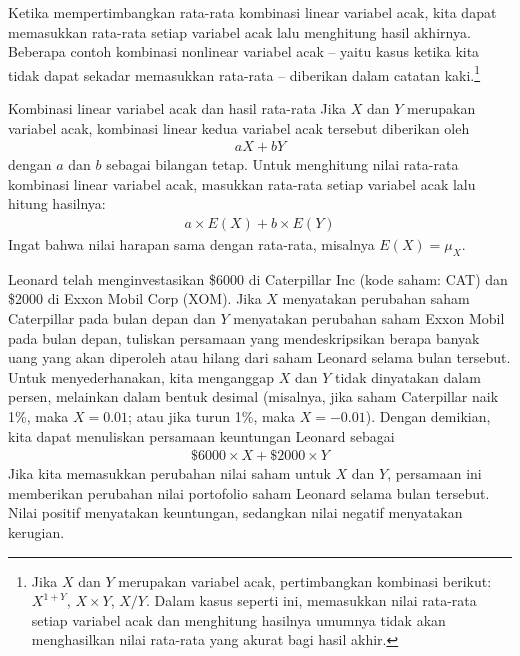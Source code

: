 \D{\newpage}

Ketika mempertimbangkan rata-rata kombinasi linear variabel acak, kita dapat memasukkan rata-rata setiap variabel acak lalu menghitung hasil akhirnya. Beberapa contoh kombinasi nonlinear variabel acak -- yaitu kasus ketika kita tidak dapat sekadar memasukkan rata-rata -- diberikan dalam catatan kaki.\footnote{Jika $X$ dan $Y$ merupakan variabel acak, pertimbangkan kombinasi berikut: $X^{1+Y}$, $X\times Y$, $X/Y$. Dalam kasus seperti ini, memasukkan nilai rata-rata setiap variabel acak dan menghitung hasilnya umumnya tidak akan menghasilkan nilai rata-rata yang akurat bagi hasil akhir.}

\begin{onebox}{Kombinasi linear variabel acak dan hasil rata-rata}
Jika $X$ dan $Y$ merupakan variabel acak, kombinasi linear kedua variabel acak tersebut diberikan oleh
\begin{align*}
aX + bY
\end{align*}
dengan $a$ dan $b$ sebagai bilangan tetap. Untuk menghitung nilai rata-rata kombinasi linear variabel acak, masukkan rata-rata setiap variabel acak lalu hitung hasilnya:
\begin{align*}
a\times E(X) + b\times E(Y)
\end{align*}
Ingat bahwa nilai harapan sama dengan rata-rata, misalnya $E(X) = \mu_X$.
\end{onebox}

\begin{examplewrap}
\begin{nexample}{Leonard telah menginvestasikan \$6000 di Caterpillar Inc
    (kode saham: CAT) dan \$2000 di Exxon Mobil Corp (XOM).
    Jika $X$ menyatakan perubahan saham Caterpillar pada bulan depan
    dan $Y$ menyatakan perubahan saham Exxon Mobil
    pada bulan depan, tuliskan persamaan yang mendeskripsikan berapa banyak
    uang yang akan diperoleh atau hilang dari saham Leonard selama
    bulan tersebut.}
  Untuk menyederhanakan, kita menganggap $X$ dan $Y$ tidak dinyatakan
  dalam persen, melainkan dalam bentuk desimal
  (misalnya, jika saham Caterpillar naik 1\%, maka $X=0.01$;
  atau jika turun 1\%, maka $X=-0.01$).
  Dengan demikian, kita dapat menuliskan persamaan keuntungan Leonard sebagai
  \begin{align*}
  \$6000\times X + \$2000\times Y
  \end{align*}
  Jika kita memasukkan perubahan nilai saham untuk $X$ dan $Y$,
  persamaan ini memberikan perubahan nilai portofolio saham Leonard
  selama bulan tersebut. Nilai positif menyatakan keuntungan,
  sedangkan nilai negatif menyatakan kerugian.
\end{nexample}
\end{examplewrap}


